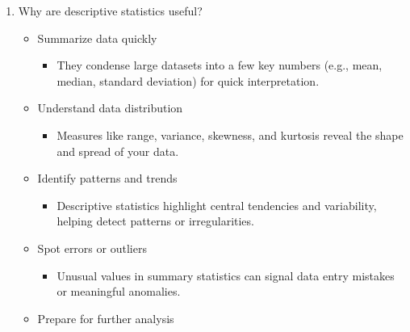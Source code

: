 \documentclass[12pt,a4paper]{article}
\providecommand{\tightlist}{%
  \setlength{\itemsep}{0pt}\setlength{\parskip}{0pt}}
\begin{document}
\begin{enumerate}
  \begin{itemize}
  \tightlist
  \item
    Unordered factor variable (nominal variable)

    \begin{itemize}
    \tightlist
    \item
      ``fruit'' with categories ``apple'', ``banana'', ``orange''
    \end{itemize}
  \item
    Ordered factor variable (ordinal variable)

    \begin{itemize}
    \tightlist
    \item
      ``education\_level'' with categories ``High School'',
      ``Bachelor'', ``Master'', ``PhD'' \newpage
    \end{itemize}
  \end{itemize}
\item
  Why are descriptive statistics useful?

  \begin{itemize}
  \tightlist
  \item
    Summarize data quickly

    \begin{itemize}
    \tightlist
    \item
      They condense large datasets into a few key numbers (e.g., mean,
      median, standard deviation) for quick interpretation.
    \end{itemize}
  \item
    Understand data distribution

    \begin{itemize}
    \tightlist
    \item
      Measures like range, variance, skewness, and kurtosis reveal the
      shape and spread of your data.
    \end{itemize}
  \item
    Identify patterns and trends

    \begin{itemize}
    \tightlist
    \item
      Descriptive statistics highlight central tendencies and
      variability, helping detect patterns or irregularities.
    \end{itemize}
  \item
    Spot errors or outliers

    \begin{itemize}
    \tightlist
    \item
      Unusual values in summary statistics can signal data entry
      mistakes or meaningful anomalies.
    \end{itemize}
  \item
    Prepare for further analysis


\end{itemize}
\end{enumerate}
\end{document}
